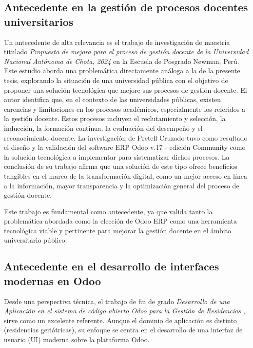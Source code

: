 \documentclass[12pt,letterpaper,spanish]{report}
\begin{document}
\subsection{Antecedente en la gestión de procesos docentes universitarios}
\label{sub:antecedente_gestion_docente}

Un antecedente de alta relevancia es el trabajo de investigación de maestría titulado \textit{Propuesta de mejora para el proceso de gestión docente de la 
Universidad Nacional Autónoma de Chota, 2024} en la Escuela de Posgrado Newman, Perú. Este estudio aborda una problemática directamente análoga a la de la presente tesis, explorando la situación de una universidad pública con el objetivo de proponer una solución tecnológica que mejore sus procesos de gestión docente.
El autor identifica que, en el contexto de las universidades públicas, existen carencias y limitaciones en los procesos académicos, especialmente los referidos a la gestión docente. Estos procesos incluyen el reclutamiento y selección, la inducción, la formación continua, la evaluación del desempeño y el reconocimiento docente. La investigación de Pretell Cruzado tuvo como resultado el diseño y la validación del software ERP Odoo v.17 - edición Community como la solución tecnológica a implementar para sistematizar dichos procesos. La conclusión de su trabajo afirma que una solución de este tipo ofrece beneficios tangibles en el marco de la transformación digital, como un mejor acceso en línea a la información, mayor transparencia y la optimización general del proceso de gestión docente.

Este trabajo es fundamental como antecedente, ya que valida tanto la problemática abordada como la elección de Odoo ERP como una herramienta tecnológica viable y pertinente para mejorar la gestión docente en el ámbito universitario público.

\subsection{Antecedente en el desarrollo de interfaces modernas en Odoo}
\label{sub:antecedente_desarrollo_tecnico}

Desde una perspectiva técnica, el trabajo de fin de grado  \textit{Desarrollo de una Aplicación en el sistema de código abierto Odoo para la Gestión de Residencias \citep{TortCarrillo2024}}, sirve como un excelente referente. Aunque el dominio de aplicación es distinto (residencias geriátricas), su enfoque se centra en el desarrollo de una interfaz de usuario (UI) moderna sobre la plataforma Odoo.
\end{document}
